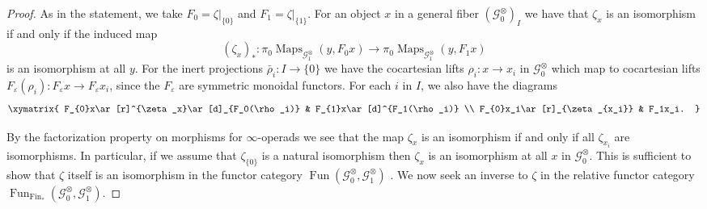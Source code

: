 \documentclass[reqno]{amsart}
\theoremstyle{definition}
\newcommand{\msc}[1]{\mathscr{#1}}
\newcommand{\ot}{\otimes}
\DeclareMathOperator{\Fun}{Fun}
\DeclareMathOperator{\Fin}{Fin}
\DeclareMathOperator{\Maps}{Maps}
\renewcommand{\1}{\mathbf{1}}
\begin{document}
\begin{proof}
As in the statement, we take $F_0=\zeta|_{\{0\}}$ and $F_1=\zeta|_{\{1\}}$.  For an object $x$ in a general fiber $(\msc{G}_0^{\ot})_I$ we have that $\zeta_x$ is an isomorphism if and only if the induced map
\[
(\zeta_x)_{\ast}:\pi_0\Maps_{\msc{G}_1^{\ot}}(y,F_0x)\to \pi_0\Maps_{\msc{G}^{\ot}_1}(y,F_1x)
\]
is an isomorphism at all $y$.  For the inert projections $\bar{\rho}_i:I\to \{0\}$ we have the cocartesian lifts $\rho_i:x\to x_i$ in $\msc{G}_0^{\ot}$ which map to cocartesian lifts $F_{\varepsilon}(\rho_i):F_{\varepsilon}x\to F_{\varepsilon}x_i$, since the $F_{\varepsilon}$ are symmetric monoidal functors. For each $i$ in $I$, we also have the diagrams
\[
\xymatrix{
F_{0}x\ar[r]^{\zeta_x}\ar[d]_{F_0(\rho_i)} & F_{1}x\ar[d]^{F_1(\rho_i)} \\
F_{0}x_i\ar[r]_{\zeta_{x_i}} & F_1x_i.
}
\]
\par

By the factorization property on morphisms for $\infty$-operads \cite[Definition 2.1.1.10]{ha} we see that the map $\zeta_x$ is an isomorphism if and only if all $\zeta_{x_i}$ are isomorphisms.  In particular, if we assume that $\zeta_{\{0\}}$ is a natural isomorphism then $\zeta_x$ is an isomorphism at all $x$ in $\msc{G}_0^{\ot}$.  This is sufficient to show that $\zeta$ itself is an isomorphism in the functor category $\Fun(\msc{G}_0^{\ot},\msc{G}_1^{\ot})$ \cite[\href{https://kerodon.net/tag/01DK}{01DK}]{kerodon}. We now seek an inverse to $\zeta$ in the relative functor category $\Fun_{\Fin_{\ast}}(\msc{G}_0^{\ot},\msc{G}_1^{\ot})$.
\par


\end{proof}
\end{document}
